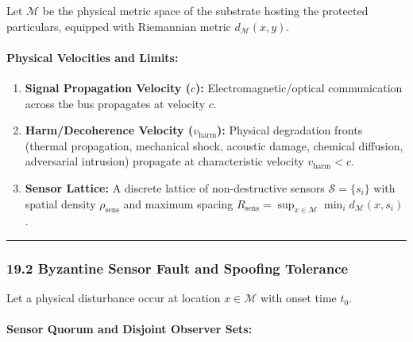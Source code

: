 \documentclass[
]{article}
\providecommand{\tightlist}{%
  \setlength{\itemsep}{0pt}\setlength{\parskip}{0pt}}
\begin{document}
Let \(\mathcal{M}\) be the physical metric space of the substrate
hosting the protected particulars, equipped with Riemannian metric
\(d_{\mathcal{M}}(x, y)\).

\paragraph{Physical Velocities and
Limits:}\label{physical-velocities-and-limits}

\begin{enumerate}
\def\labelenumi{\arabic{enumi}.}
\tightlist
\item
  \textbf{Signal Propagation Velocity (\(c\)):}
  E\allowbreak{}l\allowbreak{}e\allowbreak{}c\allowbreak{}t\allowbreak{}r\allowbreak{}o\allowbreak{}m\allowbreak{}a\allowbreak{}g\allowbreak{}n\allowbreak{}e\allowbreak{}t\allowbreak{}i\allowbreak{}c\allowbreak{}/\allowbreak{}o\allowbreak{}p\allowbreak{}t\allowbreak{}i\allowbreak{}c\allowbreak{}a\allowbreak{}l
  communication across the bus propagates at velocity \(c\).
\item
  \textbf{H\allowbreak{}a\allowbreak{}r\allowbreak{}m\allowbreak{}/\allowbreak{}D\allowbreak{}e\allowbreak{}c\allowbreak{}o\allowbreak{}h\allowbreak{}e\allowbreak{}r\allowbreak{}e\allowbreak{}n\allowbreak{}c\allowbreak{}e
  Velocity (\(v_{\mathrm{harm}}\)):} Physical degradation fronts
  (thermal propagation, mechanical shock, acoustic damage, chemical
  diffusion, adversarial intrusion) propagate at characteristic velocity
  \(v_{\mathrm{harm}} < c\).
\item
  \textbf{Sensor Lattice:} A discrete lattice of non-destructive sensors
  \(\mathcal{S} = \{s_i\}\) with spatial density
  \(\rho_{\mathrm{sens}}\) and maximum spacing
  \(R_{\mathrm{sens}} = \sup_{x \in \mathcal{M}} \min_i d_{\mathcal{M}}(x, s_i)\).
\end{enumerate}

\begin{center}\rule{0.5\linewidth}{0.5pt}\end{center}

\subsubsection{19.2 Byzantine Sensor Fault and Spoofing
Tolerance}\label{byzantine-sensor-fault-and-spoofing-tolerance}

Let a physical disturbance occur at location \(x \in \mathcal{M}\) with
onset time \(t_0\).

\paragraph{Sensor Quorum and Disjoint Observer
Sets:}\label{sensor-quorum-and-disjoint-observer-sets}
\end{document}
